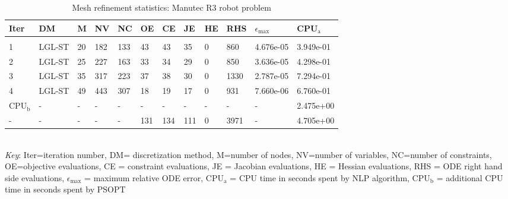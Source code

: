 
\begin{table}
\caption{Mesh refinement statistics: Manutec R3 robot problem}
\label{mesh_stats_manutec}
\renewcommand{\tabcolsep}{0.15cm}
\tiny
\begin{tabular}{llllllllllll}
Iter&DM&M&NV&NC&OE&CE&JE&HE&RHS&$\epsilon_{\max}$&CPU$_\mathrm{a}$ \\ \hline \\
1&LGL-ST&20&182&133&43&43&35&0&860&4.676e-05&3.949e-01\\
2&LGL-ST&25&227&163&33&34&29&0&850&3.636e-05&4.298e-01\\
3&LGL-ST&35&317&223&37&38&30&0&1330&2.787e-05&7.294e-01\\
4&LGL-ST&49&443&307&18&19&17&0&931&7.660e-06&6.760e-01\\
\hline
CPU$_\mathrm{b}$ &-&-&-&-&-&-&-&-&-&-&2.475e+00\\
-&-&-&-&-&131&134&111&0&3971&-&4.705e+00\\
\end{tabular}
\newline \\ \emph{Key}: Iter=iteration number, DM= discretization method, M=number of nodes, NV=number of variables, NC=number of constraints, OE=objective evaluations,  	              CE = constraint evaluations, JE = Jacobian evaluations, HE = Hessian evaluations, RHS = ODE right hand side 		      evaluations, $\epsilon_{\max}$ = maximum relative ODE error, CPU$_\mathrm{a}$ = CPU time in seconds spent by NLP algorithm, 		      CPU$_\mathrm{b}$ = additional CPU time in seconds spent by PSOPT
\normalsize
\end{table}